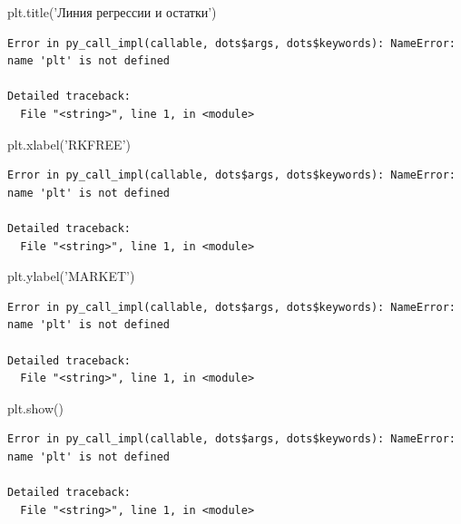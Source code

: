 \documentclass[]{book}
\newenvironment{Shaded}{\begin{snugshade}}{\end{snugshade}}
\newcommand{\NormalTok}[1]{#1}
\newcommand{\StringTok}[1]{\textcolor[rgb]{0.31,0.60,0.02}{#1}}
\begin{document}
\begin{Shaded}
\begin{Highlighting}[]
\NormalTok{plt.title(}\StringTok{'Линия регрессии и остатки'}\NormalTok{)}
\end{Highlighting}
\end{Shaded}

\begin{verbatim}
Error in py_call_impl(callable, dots$args, dots$keywords): NameError: name 'plt' is not defined

Detailed traceback: 
  File "<string>", line 1, in <module>
\end{verbatim}

\begin{Shaded}
\begin{Highlighting}[]
\NormalTok{plt.xlabel(}\StringTok{'RKFREE'}\NormalTok{)}
\end{Highlighting}
\end{Shaded}

\begin{verbatim}
Error in py_call_impl(callable, dots$args, dots$keywords): NameError: name 'plt' is not defined

Detailed traceback: 
  File "<string>", line 1, in <module>
\end{verbatim}

\begin{Shaded}
\begin{Highlighting}[]
\NormalTok{plt.ylabel(}\StringTok{'MARKET'}\NormalTok{)}
\end{Highlighting}
\end{Shaded}

\begin{verbatim}
Error in py_call_impl(callable, dots$args, dots$keywords): NameError: name 'plt' is not defined

Detailed traceback: 
  File "<string>", line 1, in <module>
\end{verbatim}

\begin{Shaded}
\begin{Highlighting}[]
\NormalTok{plt.show()}
\end{Highlighting}
\end{Shaded}

\begin{verbatim}
Error in py_call_impl(callable, dots$args, dots$keywords): NameError: name 'plt' is not defined

Detailed traceback: 
  File "<string>", line 1, in <module>
\end{verbatim}
\end{document}
